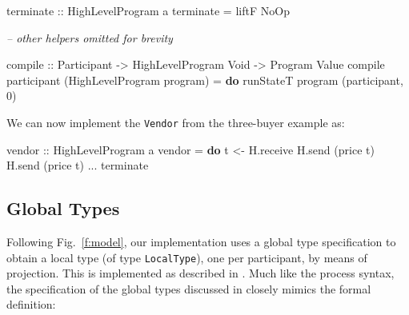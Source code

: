 \documentclass[runningheads,plain]{llncs}
\newcommand{\checkthis}[1]{#1}
\newenvironment{Shaded}{}{}
\newcommand{\KeywordTok}[1]{\textcolor[rgb]{0.00,0.44,0.13}{\textbf{#1}}}
\newcommand{\DataTypeTok}[1]{\textcolor[rgb]{0.56,0.13,0.00}{#1}}
\newcommand{\DecValTok}[1]{\textcolor[rgb]{0.25,0.63,0.44}{#1}}
\newcommand{\CommentTok}[1]{\textcolor[rgb]{0.38,0.63,0.69}{\textit{#1}}}
\newcommand{\OtherTok}[1]{\textcolor[rgb]{0.00,0.44,0.13}{#1}}
\newcommand{\FunctionTok}[1]{\textcolor[rgb]{0.02,0.16,0.49}{#1}}
\newcommand{\NormalTok}[1]{#1}
\begin{document}
\begin{Shaded}
\begin{Highlighting}[]
\OtherTok{terminate ::} \DataTypeTok{HighLevelProgram}\NormalTok{ a}
\NormalTok{terminate }\FunctionTok{=}\NormalTok{ liftF }\DataTypeTok{NoOp}

\CommentTok{-- other helpers omitted for brevity}

\OtherTok{compile ::} \DataTypeTok{Participant} \OtherTok{->} \DataTypeTok{HighLevelProgram} \DataTypeTok{Void} \OtherTok{->} \DataTypeTok{Program} \DataTypeTok{Value}
\NormalTok{compile participant (}\DataTypeTok{HighLevelProgram}\NormalTok{ program) }\FunctionTok{=} \KeywordTok{do}
\NormalTok{    runStateT program (participant, }\DecValTok{0}\NormalTok{) }
\end{Highlighting}
\end{Shaded}

We can now implement the \texttt{Vendor} from the three-buyer example as:

\begin{Shaded}
\begin{Highlighting}[]
\OtherTok{vendor ::} \DataTypeTok{HighLevelProgram}\NormalTok{ a}
\NormalTok{vendor }\FunctionTok{=} \KeywordTok{do}
\NormalTok{    t }\OtherTok{<-}\NormalTok{ H.receive}
\NormalTok{    H.send (price t)}
\NormalTok{    H.send (price t)}
    \FunctionTok{...}
\NormalTok{    terminate}
\end{Highlighting}
\end{Shaded}

\subsection{Global Types}
Following Fig.~\ref{f:model}, \checkthis{our implementation uses a global type specification to obtain a local type (of type \texttt{LocalType}), one per participant, by means of projection. This is  implemented as described in  }.
Much like the process syntax, the specification of the global types discussed in  closely mimics the formal definition:
\end{document}

